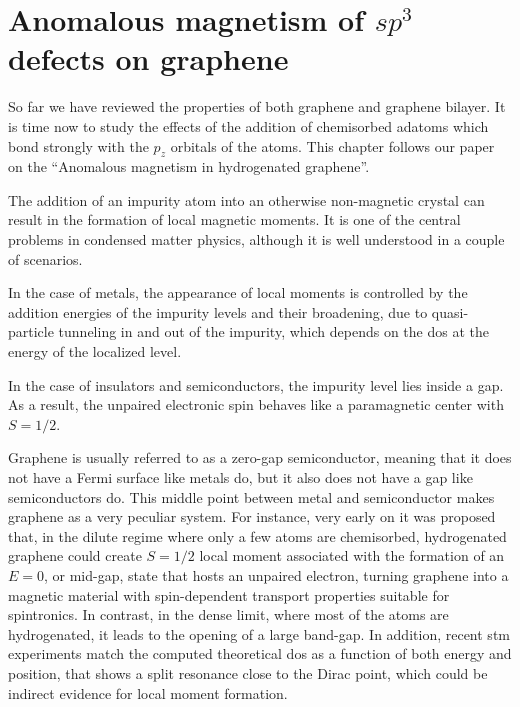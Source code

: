 \chapter{Anomalous magnetism of $sp^3$ defects on graphene}
\label{ch:vacancy}
So far we have reviewed the properties of both graphene and graphene bilayer. It is time now to study the effects of the addition of chemisorbed adatoms which bond strongly with the $p_z$ orbitals of the  atoms.
This chapter follows our paper on the ``Anomalous magnetism in hydrogenated graphene''\cite{Garcia-Martinez2015}.
\bigskip


The addition of an impurity atom into an otherwise non-magnetic crystal can result in the formation of local magnetic moments. It is one of the central problems in condensed matter physics,\cite{Anderson1961} although it is well understood in a couple of scenarios.

In the case of metals, the appearance of local moments is controlled by the addition energies of the impurity levels and their broadening, due to quasi-particle tunneling in and out of the impurity\cite{Anderson1961, Daybell1968}, which depends on the \ac{dos} at the energy of the localized level.

In the case of insulators and semiconductors, the impurity level lies inside a gap. As a result, the unpaired electronic spin behaves like a paramagnetic center with $S=1/2$.\cite{Slichter1955}
\smallskip

Graphene is usually referred to as a zero-gap semiconductor, meaning that it does not have a Fermi surface like metals do, but it also does not have a gap like semiconductors do. This middle point between metal and semiconductor makes graphene as a very peculiar system.
For instance, very early on it was proposed that, in the dilute regime where only a few atoms are chemisorbed, hydrogenated graphene could create $S=1/2$ local moment\cite{Duplock2004, Yazyev2007, Boukhvalov2008, Palacios2008, Yazyev2010, Santos2012} associated with the formation of an $E=0$, or mid-gap, state that hosts an unpaired electron, turning graphene into a magnetic material with spin-dependent transport properties suitable for spintronics.\cite{Soriano2010, Leconte2011, Soriano2011, han2014graphene}
In contrast, in the dense limit, where most of the  atoms are hydrogenated, it leads to the opening of a large band-gap\cite{elias2009,Sofo2007}. In addition, recent \ac{stm} experiments\cite{Brihuega2016} match the computed theoretical \ac{dos} as a function of both energy and position, that shows a split resonance close to the Dirac point, which could be indirect evidence for local moment formation. %



